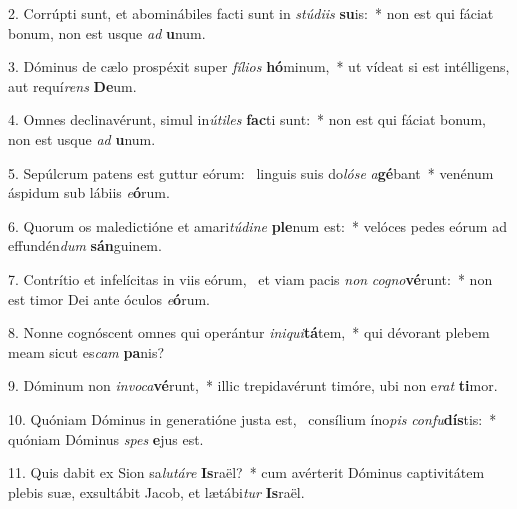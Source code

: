 2. Corrúpti sunt, et abominábiles facti sunt in \textit{stú}\textit{di}\textit{is} \textbf{su}is:~*  non est qui fáciat bonum, non est usque \textit{ad} \textbf{u}num.\

3. Dóminus de cælo prospéxit super \textit{fí}\textit{li}\textit{os} \textbf{hó}minum,~*  ut vídeat si est intélligens, aut requí\textit{rens} \textbf{De}um.\

4. Omnes declinavérunt, simul in\textit{ú}\textit{ti}\textit{les} \textbf{fac}ti sunt:~*  non est qui fáciat bonum, non est usque \textit{ad} \textbf{u}num.\

5. Sepúlcrum patens est guttur eórum: \dag\  linguis suis do\textit{ló}\textit{se} \textit{a}\textbf{gé}bant~*  venénum áspidum sub lábiis \textit{e}\textbf{ó}rum.\

6. Quorum os maledictióne et amari\textit{tú}\textit{di}\textit{ne} \textbf{ple}num est:~*  velóces pedes eórum ad effundén\textit{dum} \textbf{sán}guinem.\

7. Contrítio et infelícitas in viis eórum, \dag\  et viam pacis \textit{non} \textit{co}\textit{gno}\textbf{vé}runt:~*  non est timor Dei ante óculos \textit{e}\textbf{ó}rum.\

8. Nonne cognóscent omnes qui operántur \textit{in}\textit{i}\textit{qui}\textbf{tá}tem,~*  qui dévorant plebem meam sicut es\textit{cam} \textbf{pa}nis?\

9. Dóminum non \textit{in}\textit{vo}\textit{ca}\textbf{vé}runt,~*  illic trepidavérunt timóre, ubi non e\textit{rat} \textbf{ti}mor.\

10. Quóniam Dóminus in generatióne justa est, \dag\  consílium íno\textit{pis} \textit{con}\textit{fu}\textbf{dís}tis:~*  quóniam Dóminus \textit{spes} \textbf{e}jus est.\

11. Quis dabit ex Sion sa\textit{lu}\textit{tá}\textit{re} \textbf{Is}raël?~*  cum avérterit Dóminus captivitátem plebis suæ, exsultábit Jacob, et lætábi\textit{tur} \textbf{Is}raël.\

